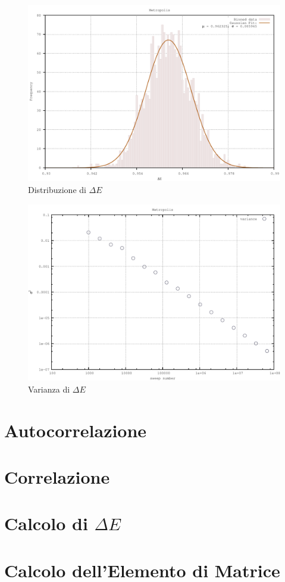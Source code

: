 \begin{figure}[H]
\centering
\includegraphics[width=\textwidth]{histogram}
\caption{Distribuzione di $\Delta E$}
\label{fig:histogram}
\end{figure}

\begin{figure}[H]
\centering
\includegraphics[width=\textwidth]{variance}
\caption{Varianza di $\Delta E$}
\label{fig:variance}
\end{figure}

\section{Autocorrelazione}
\section{Correlazione}
\section{Calcolo di $\Delta E$}
\section{Calcolo dell'Elemento di Matrice}


